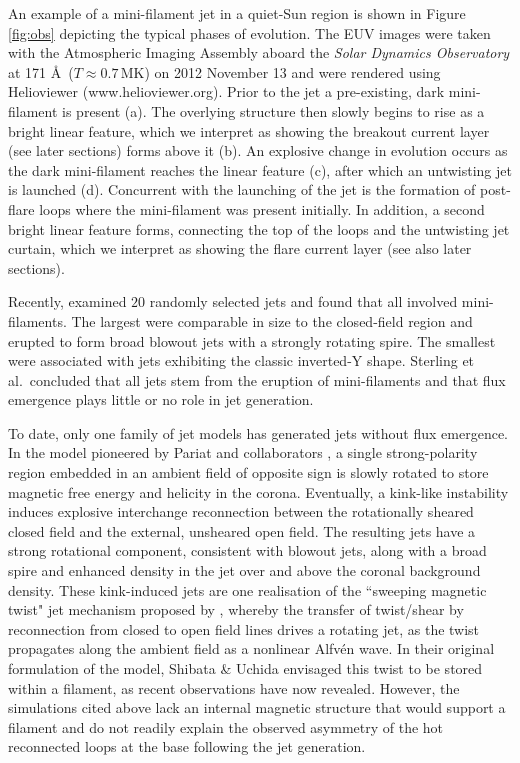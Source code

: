 \documentclass[twocolumn]{aastex6}
\begin{document}
{An example of a mini-filament jet in a quiet-Sun region \cite[one of several studied by][]{Panesar2016} is shown in Figure \ref{fig:obs} depicting the typical phases of evolution. The EUV images were taken with the Atmospheric Imaging Assembly aboard the {\it Solar Dynamics Observatory} at 171 \AA \, ($T \approx 0.7\, \text{MK}$) on 2012 November 13 and were rendered using Helioviewer (www.helioviewer.org). Prior to the jet a pre-existing, dark mini-filament is present (a). The overlying structure then slowly begins to rise as a bright linear feature, which we interpret as showing the breakout current layer (see later sections) forms above it (b). An explosive change in evolution occurs as the dark mini-filament reaches the linear feature (c), after which an untwisting jet is launched (d). Concurrent with the launching of the jet is the formation of post-flare loops where the mini-filament was present initially. In addition, a second bright linear feature forms, connecting the top of the loops and the untwisting jet curtain, which we interpret as showing the flare current layer (see also later sections).}

Recently, \citet{Sterling2015} examined $20$ randomly selected jets and found that all involved mini-filaments. The largest were comparable in size to the closed-field region and erupted to form broad blowout jets with a strongly rotating spire. The smallest were associated with jets exhibiting the classic inverted-Y shape. Sterling et al.\ concluded that all jets stem from the eruption of mini-filaments and that flux emergence plays little or no role in jet generation. 

To date, only one family of jet models has generated jets without flux emergence. In the model pioneered by Pariat and collaborators \citep{Pariat2009,Pariat2010,Pariat2015,Pariat2016,Dalmasse2012,Wyper2016,Wyper2016b,Karpen2017}, a single strong-polarity region embedded in an ambient field of opposite sign is slowly rotated to store magnetic free energy and helicity in the corona. Eventually, a kink-like instability induces explosive interchange reconnection between the rotationally sheared closed field and the external, unsheared open field. The resulting jets have a strong rotational component, consistent with blowout jets, along with a broad spire and enhanced density in the jet over and above the coronal background density. These kink-induced jets are one realisation of the ``sweeping magnetic twist" jet mechanism proposed by \citet{Shibata1986}, whereby the transfer of twist/shear by reconnection from closed to open field lines drives a rotating jet, as the twist propagates along the ambient field as a nonlinear Alfv\'{e}n wave. In their original formulation of the model, Shibata \& Uchida envisaged this twist to be stored within a filament, as recent observations have now revealed. However, the simulations cited above lack an internal magnetic structure that would support a filament and do not readily explain the observed asymmetry of the hot reconnected loops at the base following the jet generation.
\end{document}
